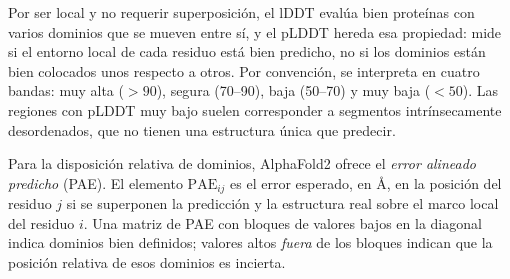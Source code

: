 \begin{simbolos}
\end{simbolos}

Por ser local y no requerir superposición, el lDDT evalúa bien proteínas con varios dominios que se mueven entre sí, y el pLDDT hereda esa propiedad: mide si el entorno local de cada residuo está bien predicho, no si los dominios están bien colocados unos respecto a otros. Por convención, se interpreta en cuatro bandas: muy alta ($>90$), segura (70--90), baja (50--70) y muy baja ($<50$). Las regiones con pLDDT muy bajo suelen corresponder a segmentos intrínsecamente desordenados, que no tienen una estructura única que predecir.

Para la disposición relativa de dominios, AlphaFold2 ofrece el \emph{error alineado predicho} (PAE). El elemento $\mathrm{PAE}_{ij}$ es el error esperado, en \si{\angstrom}, en la posición del residuo $j$ si se superponen la predicción y la estructura real sobre el marco local del residuo $i$. Una matriz de PAE con bloques de valores bajos en la diagonal indica dominios bien definidos; valores altos \emph{fuera} de los bloques indican que la posición relativa de esos dominios es incierta.

